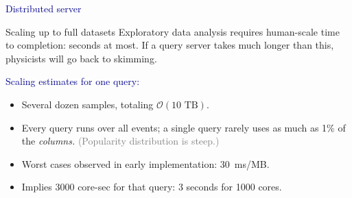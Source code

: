\documentclass{beamer}
\begin{document}



\begin{frame}{}
\begin{center}
\LARGE \textcolor{darkblue}{Distributed server}
\end{center}
\end{frame}

\begin{frame}{Scaling up to full datasets}
Exploratory data analysis requires human-scale time to completion: seconds at most. If a query server takes much longer than this, physicists will go back to skimming.

\vfill
\textcolor{darkblue}{Scaling estimates for one query:}
\begin{itemize}
\item Several dozen samples, totaling $\mathcal{O}(\mbox{10~TB})$.
\item Every query runs over all events; a single query rarely uses as much as 1\% of the {\it columns.} \textcolor{gray}{(Popularity distribution is steep.)}
\item Worst cases observed in early implementation: 30~ms/MB.
\item Implies 3000 core-sec for that query: 3 seconds for 1000 cores.
\end{itemize}
\end{frame}
\end{document}
